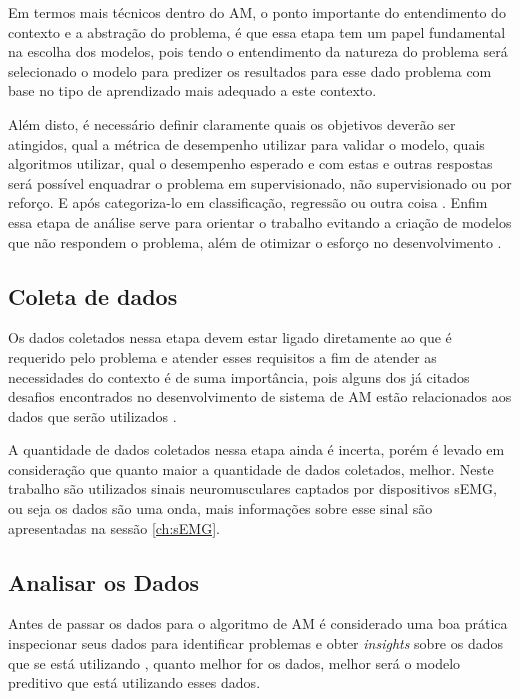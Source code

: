 Em termos mais técnicos dentro do AM, o ponto importante do entendimento do contexto e a abstração do problema, é que essa etapa tem um papel fundamental na escolha dos modelos, pois tendo o entendimento da natureza do problema será selecionado o modelo para predizer os resultados para esse dado problema com base no tipo de aprendizado mais adequado a este contexto.

Além disto, é necessário definir claramente quais os objetivos deverão ser atingidos, qual a métrica de desempenho utilizar para validar o modelo, quais algoritmos utilizar, qual o desempenho esperado e com estas e outras respostas será possível enquadrar o problema em supervisionado, não supervisionado ou por reforço. E após categoriza-lo em classificação, regressão ou outra coisa \cite{geron2017hands}. Enfim essa etapa de análise serve para orientar o trabalho evitando a criação de modelos que não respondem o problema, além de otimizar o esforço no desenvolvimento \cite{Amazon}.

\subsection{Coleta de dados}

Os dados coletados nessa etapa devem estar ligado diretamente ao que é requerido pelo problema e atender esses requisitos a fim de atender as necessidades do contexto é de suma importância, pois alguns dos já citados desafios encontrados no desenvolvimento de sistema de AM estão relacionados aos dados que serão utilizados \cite{geron2017hands}.

A quantidade de dados coletados nessa etapa ainda é incerta, porém é levado em consideração que quanto maior a quantidade de dados coletados, melhor. Neste trabalho são utilizados sinais neuromusculares captados por dispositivos sEMG, ou seja os dados são uma onda, mais informações sobre esse sinal são apresentadas na sessão \ref{ch:sEMG}.

\subsection{Analisar os Dados}

Antes de passar os dados para o algoritmo de AM é considerado uma boa prática inspecionar seus dados para identificar problemas e obter \textit{insights} sobre os dados que se está utilizando \cite{Amazon}, quanto melhor for os dados, melhor será o modelo preditivo que está utilizando esses dados.

